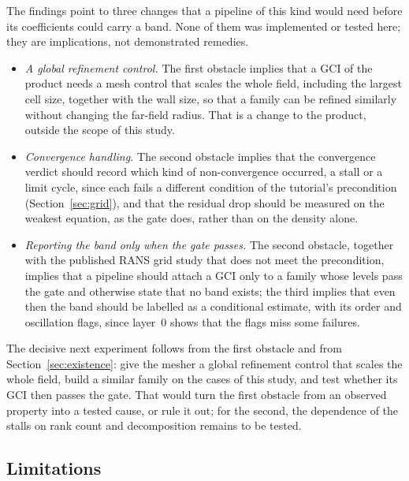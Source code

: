 \documentclass[twocolumn]{labreport}
\begin{document}
The findings point to three changes that a pipeline of this kind would need before its coefficients could carry a band.
None of them was implemented or tested here; they are implications, not demonstrated remedies.
\begin{itemize}
\item \emph{A global refinement control.} The first obstacle implies that a GCI of the product needs a mesh control that scales the whole field, including the largest cell size, together with the wall size, so that a family can be refined similarly without changing the far-field radius.
That is a change to the product, outside the scope of this study.
\item \emph{Convergence handling.} The second obstacle implies that the convergence verdict should record which kind of non-convergence occurred, a stall or a limit cycle, since each fails a different condition of the tutorial's precondition (Section~\ref{sec:grid}), and that the residual drop should be measured on the weakest equation, as the gate does, rather than on the density alone.
\item \emph{Reporting the band only when the gate passes.} The second obstacle, together with the published RANS grid study that does not meet the precondition, implies that a pipeline should attach a GCI only to a family whose levels pass the gate and otherwise state that no band exists; the third implies that even then the band should be labelled as a conditional estimate, with its order and oscillation flags, since layer~0 shows that the flags miss some failures.
\end{itemize}
The decisive next experiment follows from the first obstacle and from Section~\ref{sec:existence}: give the mesher a global refinement control that scales the whole field, build a similar family on the cases of this study, and test whether its GCI then passes the gate.
That would turn the first obstacle from an observed property into a tested cause, or rule it out; for the second, the dependence of the stalls on rank count and decomposition remains to be tested.

\subsection{Limitations}
\label{sec:limits}
\end{document}
